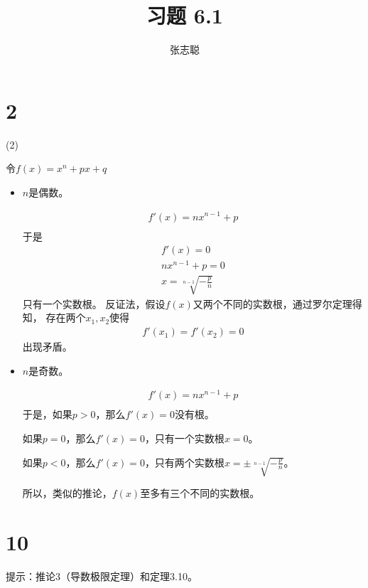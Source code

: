 \documentclass{article}
\begin{document}
\title{习题 6.1}
\author{张志聪}
\maketitle

\section*{2}

 (2)

令$f(x) = x^n + px + q$
\begin{itemize}
  \item $n$是偶数。

        \begin{align*}
          f'(x) = n x^{n-1} + p \\
        \end{align*}
        于是
        \begin{align*}
          f'(x) = 0         \\
          n x^{n-1} + p = 0 \\
          x = \sqrt[n - 1]{-\frac{p}{n}}
        \end{align*}
        只有一个实数根。
        反证法，假设$f(x)$又两个不同的实数根，通过罗尔定理得知，
        存在两个$x_1, x_2$使得
        \begin{align*}
          f'(x_1) = f'(x_2) = 0
        \end{align*}
        出现矛盾。

  \item $n$是奇数。

        \begin{align*}
          f'(x) = n x^{n-1} + p \\
        \end{align*}
        于是，如果$p > 0$，那么$f'(x) = 0$没有根。

        如果$p = 0$，那么$f'(x) = 0$，只有一个实数根$x = 0$。

        如果$p < 0$，那么$f'(x) = 0$，只有两个实数根$x = \pm \sqrt[n - 1]{-\frac{p}{n}}$。

        所以，类似的推论，$f(x)$至多有三个不同的实数根。


\end{itemize}


\section*{10}

提示：推论3（导数极限定理）和定理3.10。
\end{document}
